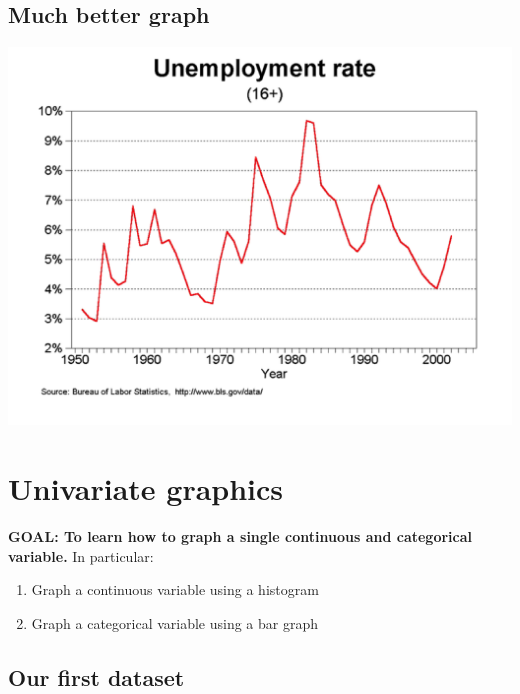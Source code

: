 \documentclass[
]{book}
\providecommand{\tightlist}{%
  \setlength{\itemsep}{0pt}\setlength{\parskip}{0pt}}
\begin{document}
\hypertarget{much-better-graph}{%
\subsection{Much better graph}\label{much-better-graph}}

\includegraphics{Stata/StataGraphics/images/Good.png}

\hypertarget{univariate-graphics}{%
\section{Univariate graphics}\label{univariate-graphics}}

\begin{alert}

\textbf{GOAL: To learn how to graph a single continuous and categorical variable.} In particular:

\begin{enumerate}
\def\labelenumi{\arabic{enumi}.}
\tightlist
\item
  Graph a continuous variable using a histogram
\item
  Graph a categorical variable using a bar graph
\end{enumerate}

\end{alert}

\hypertarget{our-first-dataset}{%
\subsection{Our first dataset}\label{our-first-dataset}}
\end{document}
